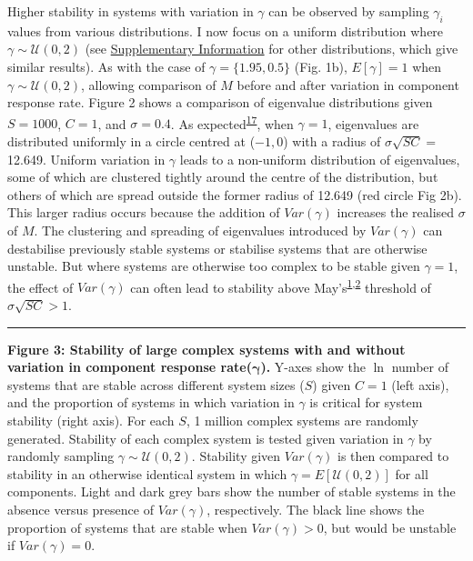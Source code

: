 \documentclass[]{article}
\begin{document}
Higher stability in systems with variation in \(\gamma\) can be observed
by sampling \(\gamma_{i}\) values from various distributions. I now
focus on a uniform distribution where \(\gamma \sim \mathcal{U}(0, 2)\)
(see \hyperlink{SIstart}{Supplementary Information} for other distributions, 
which give
similar results). As with the case of \(\gamma = \{1.95, 0.5\}\) (Fig.
1b), \(E[\gamma] = 1\) when \(\gamma \sim \mathcal{U}(0, 2)\), allowing
comparison of \(M\) before and after variation in component response
rate. Figure 2 shows a comparison of eigenvalue distributions given
\(S = 1000\), \(C = 1\), and \(\sigma = 0.4\). As
expected\textsuperscript{\protect\hyperlink{ref-Tao2010}{17}}, when
\(\gamma = 1\), eigenvalues are distributed uniformly in a circle
centred at (\(-1, 0\)) with a radius of \(\sigma\sqrt{SC} =\) 12.649.
Uniform variation in \(\gamma\) leads to a non-uniform distribution of
eigenvalues, some of which are clustered tightly around the centre of
the distribution, but others of which are spread outside the former
radius of 12.649 (red circle Fig 2b). This larger radius occurs because
the addition of \(Var(\gamma)\) increases the realised \(\sigma\) of
\(M\). The clustering and spreading of eigenvalues introduced by
\(Var(\gamma)\) can destabilise previously stable systems or stabilise
systems that are otherwise unstable. But where systems are otherwise too
complex to be stable given \(\gamma = 1\), the effect of \(Var(\gamma)\)
can often lead to stability above
May's\textsuperscript{\protect\hyperlink{ref-May1972}{1},\protect\hyperlink{ref-Allesina2012}{2}}
threshold of \(\sigma\sqrt{SC} > 1\).

\begin{center}\rule{0.5\linewidth}{\linethickness}\end{center}

\textbf{Figure 3: Stability of large complex systems with and without
variation in component response rate(\(\boldsymbol{\gamma}\)).} Y-axes show
the \(\ln\) number of systems that are stable across different system sizes
(\(S\)) given \(C = 1\) (left axis), and the proportion of systems in which
variation in \(\gamma\) is critical for system stability (right axis). For each
\(S\), 1 million complex systems are randomly generated. Stability of
each complex system is tested given variation in \(\gamma\) by randomly
sampling \(\gamma \sim \mathcal{U}(0, 2)\). Stability given
\(Var(\gamma)\) is then compared to stability in an otherwise identical
system in which \(\gamma = E[\mathcal{U}(0, 2)]\) for all components.
Light and dark grey bars show the number of stable systems in the
absence versus presence of \(Var(\gamma)\), respectively. The black line
shows the proportion of systems that are stable when
\(Var(\gamma) > 0\), but would be unstable if \(Var(\gamma) = 0\).
\end{document}
